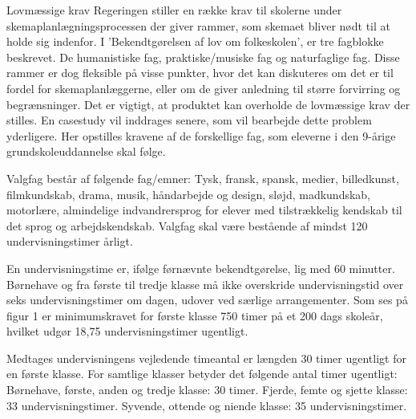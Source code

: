 Lovmæssige krav
Regeringen stiller en række krav til skolerne under skemaplanlægningsprocessen der giver rammer, som skemaet bliver nødt til at holde sig indenfor. I 'Bekendtgørelsen af lov om folkeskolen', er tre fagblokke beskrevet. De humanistiske fag, praktiske/musiske fag og naturfaglige fag. Disse rammer er dog fleksible på visse punkter, hvor det kan diskuteres om det er til fordel for skemaplanlæggerne, eller om de giver anledning til større forvirring og begrænsninger. Det er vigtigt, at produktet kan overholde de lovmæssige krav der stilles. En casestudy vil inddrages senere, som vil bearbejde dette problem yderligere. Her opstilles kravene af de forskellige fag, som eleverne i den 9-årige grundskoleuddannelse skal følge.\cite{lov2016}

 Valgfag består af følgende fag/emner: Tysk, fransk, spansk, medier, billedkunst, filmkundskab, drama, musik, håndarbejde og design, sløjd, madkundskab, motorlære, almindelige indvandrersprog for elever med tilstrækkelig kendskab til det sprog og arbejdskendskab.
Valgfag skal være bestående af mindst 120 undervisningstimer årligt.\cite{lov2016}

En undervisningstime er, ifølge førnævnte bekendtgørelse, lig med 60 minutter. Børnehave og fra første til tredje klasse må ikke overskride undervisningstid over seks undervisningstimer om dagen, udover ved særlige arrangementer.
Som ses på figur 1 er minimumskravet for første klasse 750 timer på et 200 dags skoleår, hvilket udgør 18,75 undervisningstimer ugentligt. \cite{timeskema2016}

Medtages undervisningens vejledende timeantal er længden 30 timer ugentligt for en første klasse. For samtlige klasser betyder det følgende antal timer ugentligt:
Børnehave, første, anden og tredje klasse: 30 timer.
Fjerde, femte og sjette klasse: 33 undervisningstimer.
Syvende, ottende og niende klasse: 35 undervisningstimer.

